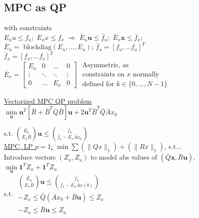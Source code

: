 \documentclass[10pt,parskip]{scrartcl}
\begin{document}
\begin{multicols*}{3}
\subsection{MPC as QP} with constraints\\
$ E_u u \leq f_u;$ $E_x x \leq f_x$ \hspace*{5mm} $\Rightarrow$ \hspace*{5mm}
$\bar E_u  \mathbf u \leq \bar f_u;$ $\bar E_x  \mathbf x \leq \bar f_x;$\\
$\bar E_u = $ blockdiag$(E_u,...,E_u)$;  $\bar f_u =[f_u,...f_u]^T$\\
 $\bar f_x =[f_x,...f_x]^T$\\
$\bar E_x =
\begin{bmatrix}
  E_x & 0 & \dots  &0\\
 \vdots & \ddots & \ddots  & \vdots\\
 0 & \dots &  E_x & 0
\end{bmatrix}$
\hspace*{8mm}
$\left. \begin{matrix}
\text{Asymmetric, as} \\
\text{constraints on }x \text{ normally}\\
\text{defined for }k \in \{0,...,N-1\}
\end{matrix} \right . $

\underline{Vectorized MPC QP problem}\\
\hspace*{8mm}$\min\limits_{\mathbf u} \mathbf u^T [\bar R + \bar B^T \bar Q \bar B] \mathbf u + 2 \mathbf u^T \bar B^T \bar Q \bar A x_0$

\hspace*{8mm} s.t. $\binom{\bar E_u}{\bar E_x \bar B} \mathbf u \leq \binom{\bar f_u}{\bar f_x - \bar E_x \bar A x_0} $\\

\underline{MPC, LP $p = 1$:} $\min \sum (\|Qx\|_1) +(\|Rx\|_1)$, s.t...\\
Introduce vectors $(Z_x,Z_u)$ to model abs values of $(\bar Q\mathbf x, \bar R\mathbf u)$.\\
\hspace*{8mm}$\min\limits_{\mathbf u} \mathbf 1^T Z_x + \mathbf 1^T Z_u$\\
\hspace*{8mm} s.t. 
$\left. \begin{matrix}
\binom{\bar E_u}{\bar E_x \bar B} \mathbf u \leq \binom{\bar f_u}{\bar f_x - \bar E_x \bar A x(0)} \\
-Z_x \leq \bar Q ( \bar A x_0 + \bar B \mathbf u) \leq Z_x\\
-Z_u \leq \bar R \mathbf u \leq Z_u
\end{matrix} \right .$



\end{multicols*}
\end{document}
